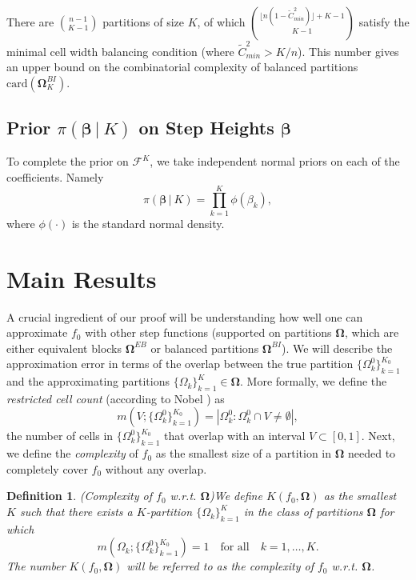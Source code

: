 \documentclass{article}
\newcommand{\1}{\mathbb{I}}
\newcommand{\bm}[1]{\boldsymbol{#1}}
\def\C {\,|\:}
\def\C {\,|\:}
\def\b{\bm{\beta}}
\def\b{\bm{\beta}}
\newtheorem{definition}{Definition}[section]
\theoremstyle{assumption}
\begin{document}
\vspace{-0.3cm}
There are ${n-1\choose K-1}$  partitions of size $K$, of which  ${{\lfloor n(1-\widetilde{C}^2_{min})\rfloor+K-1} \choose {K-1}}$ satisfy the minimal cell  width balancing condition (where $\widetilde{C}^2_{min}>K/n$). This number gives  an upper bound on the combinatorial complexity of balanced partitions $\mathrm{card}(\bm{\Omega}^{BI}_K)$. 


\vspace{-0.2cm}
\subsection{Prior $\pi(\b\C K)$ on Step Heights $\b$}
To complete the prior on $\mathcal{F}^K$,  we take independent normal priors on each of the coefficients. Namely
\begin{equation}\label{eq:prior_beta}
\pi(\b\C K)=\prod_{k=1}^K\phi(\beta_k),
\end{equation}
where $\phi(\cdot)$ is the standard normal density.



\section{Main Results}
A crucial ingredient of our proof will be understanding  how well one can approximate $f_0$ with other step functions (supported on partitions $\bm{\Omega}$, which are either equivalent blocks $\bm{\Omega}^{EB}$ or balanced partitions $\bm{\Omega}^{BI}$).  We will describe the approximation error in terms of the overlap between the true partition $\{\Omega^0_k\}_{k=1}^{K_0}$ and the approximating partitions $\{\Omega_k\}_{k=1}^K\in\bm{\Omega}$. More formally, we define the {\sl restricted cell count} (according to Nobel \cite{nobel}) as
$$
m\left(V; \{\Omega_k^0\}_{k=1}^{K_0}\right)=|\Omega_k^0: \Omega_k^0\cap V\neq \emptyset|,
$$
the number of cells in $\{\Omega_k^0\}_{k=1}^{K_0}$ that overlap with an interval $V\subset [0,1]$. Next, we define the {\sl complexity}  of $f_0$ as the smallest size of a partition in $\bm{\Omega}$ needed to completely cover $f_0$ without any overlap.

\begin{definition}(Complexity of $f_0$ w.r.t. $\bm{\Omega}$)\label{def:K0}
We define $K(f_0,\bm{\Omega})$ as the smallest $K$ such that there exists a $K$-partition $\{\Omega_k\}_{k=1}^K$ in the class of partitions $\bm{\Omega}$ for which
$$
m\left(\Omega_k; \{\Omega_k^0\}_{k=1}^{K_0}\right)=1\quad \text{for all} \quad k=1,\dots, K.
$$
 The number $K(f_0,\bm{\Omega})$ will be referred to as the {\sl complexity of $f_0$ w.r.t. $\bm{\Omega}$}. 
\end{definition}
\end{document}
